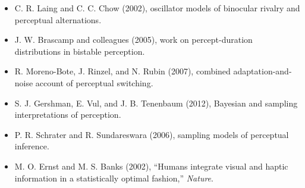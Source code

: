 \begin{itemize}
    \item C. R. Laing and C. C. Chow (2002), oscillator models of binocular rivalry and perceptual alternations.
    \item J. W. Brascamp and colleagues (2005), work on percept-duration distributions in bistable perception.
    \item R. Moreno-Bote, J. Rinzel, and N. Rubin (2007), combined adaptation-and-noise account of perceptual switching.
    \item S. J. Gershman, E. Vul, and J. B. Tenenbaum (2012), Bayesian and sampling interpretations of perception.
    \item P. R. Schrater and R. Sundareswara (2006), sampling models of perceptual inference.
    \item M. O. Ernst and M. S. Banks (2002), ``Humans integrate visual and haptic information in a statistically optimal fashion,'' \emph{Nature}.
\end{itemize}
